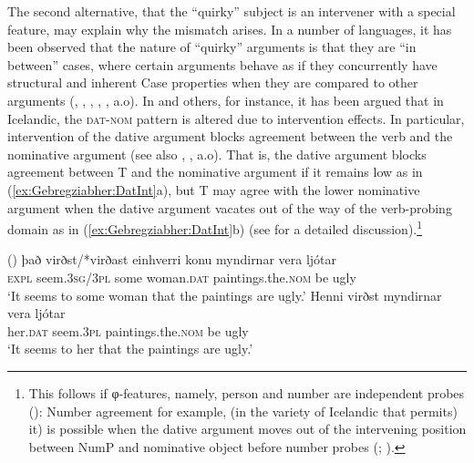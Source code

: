\documentclass[output=paper]{langscibook}
\begin{document}
The second alternative, that the ``quirky'' subject is an intervener with a special feature, may explain why the mismatch arises. In a number of languages, it has been observed that the nature of ``quirky'' arguments is that they are ``in between'' cases, where certain arguments behave as if they concurrently have structural and inherent Case properties when they are compared to other arguments (\citealt{marantz91}, \citealt{mcginnis98}, \citealt{baker08}, \citealt{pesetskyandtorrego11}, \citealt{alexiadou14}, a.o). In \citet{sigurandholm08} and others, for instance, it has been argued that in Icelandic, the {\scshape dat-nom} pattern is altered due to intervention effects. In particular, intervention of the dative argument blocks agreement between the verb and the nominative argument (see also \citealt{boeckx00}, \citealt{sigurandholm08}, a.o). That is, the dative argument blocks agreement between T and the nominative argument if it remains low as in (\ref{ex:Gebregziabher:DatInt}a), but T may agree with the lower nominative argument when the dative argument vacates out of the way of the verb-probing domain as in (\ref{ex:Gebregziabher:DatInt}b) (see \citealt{sigurandholm08} for a detailed discussion).\footnote{This follows if φ-features, namely, person and number are independent probes (\citealt{bejarandrezac09}): Number agreement for example, (in the variety of Icelandic that permits) it) is possible when the dative argument moves out of the intervening position between NumP and nominative object before number probes (\citealt{holmbergandthorbjorg2003}; \citealt{sigurandholm08}).}

\ea\label{ex:Gebregziabher:DatInt}(\citealt[252]{sigurandholm08})
\ea \gll það virðst/*virðast einhverri konu myndirnar vera lj\'otar\\
{\scshape expl} seem.{\scshape 3sg/3pl} some woman.{\scshape dat} paintings.the.{\scshape nom} be ugly\\
\glt `It seems to some woman that the paintings are ugly.' 
\ex \gll Henni virðst myndirnar vera lj\'otar\\
her.{\scshape dat} seem.{\scshape 3pl} paintings.the.{\scshape nom} be ugly\\
\glt `It seems to her that the paintings are ugly.'
\z
\z
\end{document}
